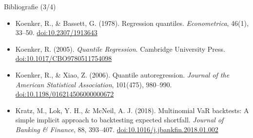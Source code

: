 \begin{frame}{Bibliografie (3/4)}
\begin{itemize}
    \item Koenker, R., \& Bassett, G. (1978). Regression quantiles. \textit{Econometrica}, 46(1), 33--50. \href{https://doi.org/10.2307/1913643}{doi:10.2307/1913643}
    \item Koenker, R. (2005). \textit{Quantile Regression}. Cambridge University Press. \href{https://doi.org/10.1017/CBO9780511754098}{doi:10.1017/CBO9780511754098}
    \item Koenker, R., \& Xiao, Z. (2006). Quantile autoregression. \textit{Journal of the American Statistical Association}, 101(475), 980--990. \href{https://doi.org/10.1198/016214506000000672}{doi:10.1198/016214506000000672}
    \item Kratz, M., Lok, Y. H., \& McNeil, A. J. (2018). Multinomial VaR backtests: A simple implicit approach to backtesting expected shortfall. \textit{Journal of Banking \& Finance}, 88, 393--407. \href{https://doi.org/10.1016/j.jbankfin.2018.01.002}{doi:10.1016/j.jbankfin.2018.01.002}
\end{itemize}
\end{frame}

